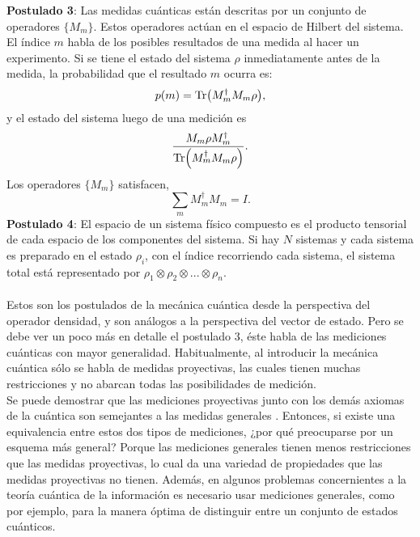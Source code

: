 \textbf{Postulado 3}: Las medidas cuánticas están descritas por un conjunto de operadores $ \{  M_{m} \}$. Estos operadores actúan en el espacio de Hilbert del sistema. El índice $m$ habla de los posibles resultados de una medida al hacer un experimento. Si se tiene el estado del sistema $\rho$ inmediatamente antes de la medida, la probabilidad que el resultado $m$ ocurra es:
\begin{equation}
p(m)= \Tr (M^{\dagger}_{m}M_{m} \rho),
\end{equation}
y el estado del sistema luego de una medición es
\begin{equation}
\frac{M_{m} \rho M_{m}^{\dagger}}{\Tr(M^{\dagger}_{m}M_{m} \rho)}.
\end{equation}
Los operadores $\{  M_{m} \}$ satisfacen,
\begin{equation}
\sum_{m} M^{\dagger}_{m}M_{m} = I.
\end{equation}
\textbf{Postulado 4}: El espacio de un sistema físico compuesto es el producto tensorial de cada espacio de los componentes del sistema. Si  hay $N$ sistemas y cada sistema es preparado en el estado $\rho_{i}$, con el índice recorriendo cada sistema, el sistema total está representado por $\rho_{1} \otimes \rho_{2} \otimes ...\otimes \rho_{n}$.
\\
\\
Estos son los postulados de la mecánica cuántica desde la perspectiva del operador densidad, y son análogos a la perspectiva del vector de estado. Pero se debe ver un poco más en detalle el postulado 3, éste habla de las mediciones cuánticas con mayor generalidad. Habitualmente, al introducir la mecánica cuántica sólo se habla de medidas proyectivas, las cuales tienen muchas restricciones y no abarcan todas las posibilidades de medición.
\\	
Se puede demostrar que las mediciones proyectivas junto con los demás axiomas de la cuántica son semejantes a las medidas generales \cite{NielsenInformation}. Entonces, si existe una equivalencia entre estos dos tipos de mediciones, ¿por qué preocuparse por un esquema más general? Porque las mediciones generales tienen menos restricciones que las medidas proyectivas, lo cual da una variedad de propiedades que las medidas proyectivas no tienen. Además, en algunos problemas concernientes a la teoría cuántica de la información es necesario usar mediciones generales, como por ejemplo, para la manera óptima de distinguir entre un conjunto de estados cuánticos.
\\
